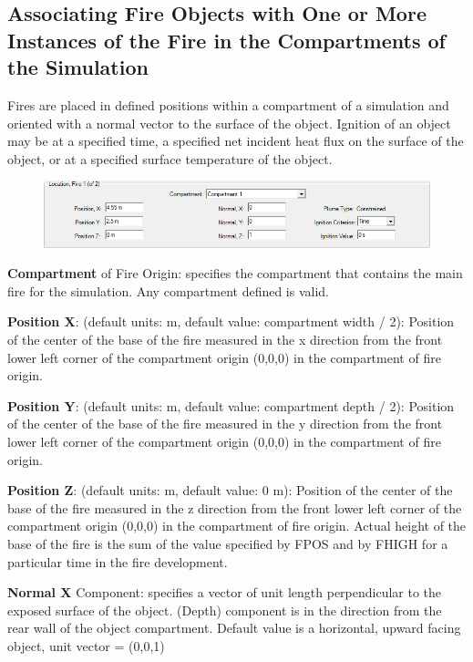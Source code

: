 \subsection{Associating Fire Objects with One or More Instances of the Fire in the Compartments of the Simulation}

Fires  are placed in defined positions within a compartment of a simulation and oriented with a normal vector to the surface of the object.  Ignition of an object may be at a specified time, a specified net incident heat flux on the surface of the object, or at a specified surface temperature of the object.

\begin{figure}[h!]
\begin{center}
\includegraphics[width=6.5in]{FIGURES/Input_File/Fire_Positioning}
\end{center}
\end{figure}

\textbf{Compartment} of Fire Origin: specifies the compartment that contains the main fire for the simulation.  Any compartment defined is valid.

\textbf{Position X}: (default units: m, default value: compartment width / 2): Position of the center of the base of the fire measured in the x direction from the front lower left corner of the compartment origin (0,0,0) in the compartment of fire origin.

\textbf{Position Y}: (default units: m, default value: compartment depth / 2): Position of the center of the base of the fire measured in the y direction from the front lower left corner of the compartment origin (0,0,0) in the compartment of fire origin.

\textbf{Position Z}: (default units: m, default value: 0 m): Position of the center of the base of the fire measured in the z direction from the front lower left corner of the compartment origin (0,0,0) in the compartment of fire origin. Actual height of the base of the fire is the sum of the value specified by FPOS and by FHIGH for a particular time in the fire development.

\textbf{Normal  X} Component: specifies a vector of unit length perpendicular to the exposed surface of the object. (Depth) component is in the direction from the rear wall of the object compartment. Default value is a horizontal, upward facing object, unit vector = (0,0,1)

